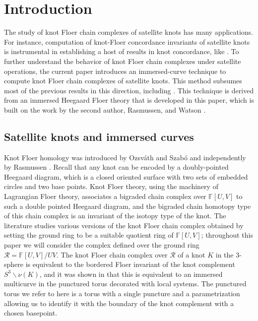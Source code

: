 \documentclass{amsart}
\theoremstyle{definition}
\theoremstyle{remark}
\numberwithin{equation}{section}
\numberwithin{equation}{section} \makeatletter
\begin{document}
\section{Introduction}
The study of knot Floer chain complexes of satellite knots has many applications. For instance, computation of knot-Floer concordance invariants of satellite knots is instrumental in establishing a host of results in knot concordance, like  \cite{Cochran2013,Hom2015,MR3589337,Hedden2016, Ozsvath2017, Hom2021, Dai2021, Hom2022}. To further understand the behavior of knot Floer chain complexes under satellite operations,
the current paper introduces an immersed-curve technique to compute knot Floer chain complexes of satellite knots. This method subsumes most of the previous results in this direction, including  \cite{Hedden2005,MR2372849,MR2511910,VanCott2010, MR3134023,MR3217622, HLV2014, MR3589337,Hanselman2023,Chen2019}. This technique is derived from an immersed Heegaard Floer theory that is developed in this paper, which is built on the work by the second author, Rasmussen, and Watson  \cite{hanselman2016bordered}.
  
\subsection{Satellite knots and immersed curves} 
Knot Floer homology was introduced by Ozsv\'ath and Szab\'o and independently by Rasmussen \cite{MR2065507,MR2704683}. Recall that any knot can be encoded by a doubly-pointed Heegaard diagram, which is a closed oriented surface with two sets of embedded circles and two base points. Knot Floer theory, using the machinery of  Lagrangian Floer theory, associates a bigraded chain complex over $\mathbb{F}[U,V]$ to such a double pointed Heegaard diagram, and the bigraded chain homotopy type of this chain complex is an invariant of the isotopy type of the knot. The literature studies various versions of the knot Floer chain complex obtained by setting the ground ring to be a suitable quotient ring of $\mathbb{F}[U,V]$; throughout this paper we will consider the complex defined over the ground ring $\mathcal{R}=\mathbb{F}[U,V]/UV$. The knot Floer chain complex over $\mathcal{R}$ of a knot $K$ in the 3-sphere is equivalent to the bordered Floer invariant of the knot complement $S^3\backslash \nu(K)$, and it was shown in \cite{hanselman2016bordered} that this is equivalent to an immersed multicurve in the punctured torus decorated with local systems. The punctured torus we refer to here is a torus with a single puncture and a parametrization allowing us to identify it with the boundary of the knot complement with a chosen basepoint.
\end{document}
